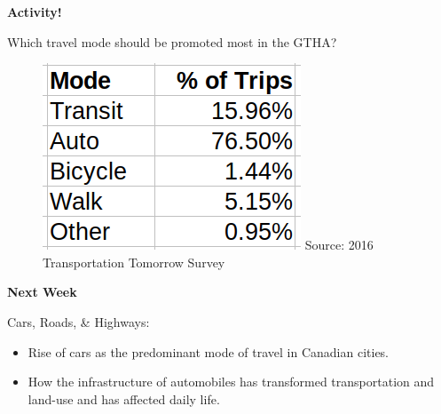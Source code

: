 \documentclass[aspectratio=169]{beamer}
\begin{document}
\begin{frame}
	
	\Large{\textbf{Activity!}}
	
	\vspace{4mm}
	
	\normalsize
	Which travel mode should be promoted most in the GTHA?
		
	\vspace{4mm}

	\begin{figure}
		\centering
		\includegraphics[width=0.3\linewidth]{images/mode_share_gtha_2016.png}
		\tiny{Source: 2016 Transportation Tomorrow Survey}
	\end{figure}

\end{frame}







\begin{frame}
	\textbf{Next Week} 
	
	\vspace{4mm}
	
	Cars, Roads, \& Highways:
	
	\begin{itemize}

		
		\item Rise of cars as the predominant mode of travel in Canadian cities. 
		
		\item How the infrastructure of automobiles has transformed transportation and land-use and has affected daily life. 
	\end{itemize}

\end{frame}
\end{document}
